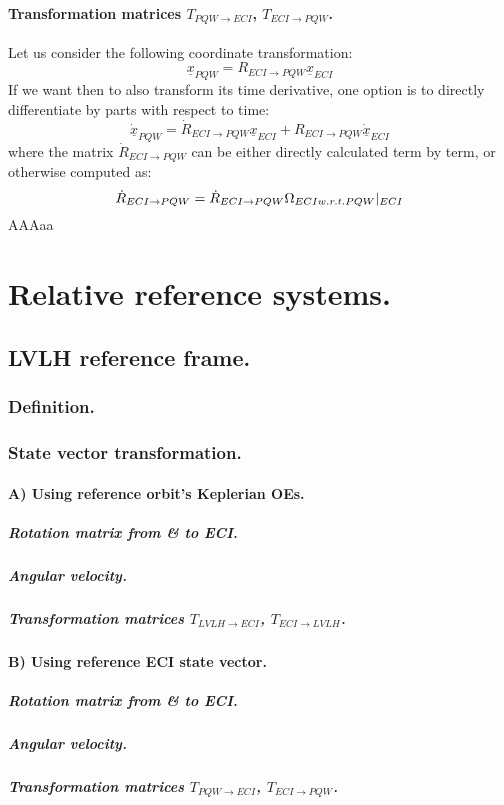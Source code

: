 			\paragraph{Transformation matrices $T_{PQW\rightarrow ECI}$, $T_{ECI\rightarrow PQW}$. \\}
			\indent Let us consider the following coordinate transformation:
			\[
			\underline{x}_{PQW} = R_{ECI\rightarrow PQW} \underline{x}_{ECI}
			\]
			\indent If we want then to also transform its time derivative, one option is to directly differentiate by parts with respect to time:
			\[
			\underline{\dot{x}}_{PQW} = \dot{R}_{ECI\rightarrow PQW} \underline{x}_{ECI} + R_{ECI\rightarrow PQW} \underline{\dot{x}}_{ECI}
			\]
			\noindent where the matrix $\dot{R}_{ECI\rightarrow PQW}$ can be either directly calculated term by term, or otherwise computed as:
			\[
			\dot{R}_{ECI\rightarrow PQW} = \dot{R}_{ECI\rightarrow PQW} \Omega_{ECI w.r.t. PQW}\rvert_{ECI}
			\]
			\indent AAAaa
		
\section{Relative reference systems.}
%
	
	\subsection{LVLH reference frame.}
		\subsubsection{Definition.}
		\subsubsection{State vector transformation.}
		\paragraph{A) Using reference orbit's Keplerian OEs. \\}
			\subparagraph{Rotation matrix from \& to ECI. \\}
			\subparagraph{Angular velocity. \\}
			\subparagraph{Transformation matrices $T_{LVLH\rightarrow ECI}$, $T_{ECI\rightarrow LVLH}$. \\}
		\paragraph{B) Using reference ECI state vector. \\}
			\subparagraph{Rotation matrix from \& to ECI. \\}
			\subparagraph{Angular velocity. \\}
			\subparagraph{Transformation matrices $T_{PQW\rightarrow ECI}$, $T_{ECI\rightarrow PQW}$. \\}
		
